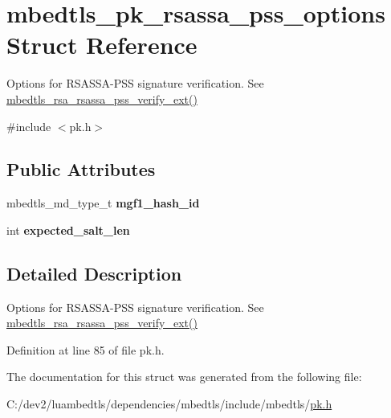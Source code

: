 \hypertarget{structmbedtls__pk__rsassa__pss__options}{\section{mbedtls\-\_\-pk\-\_\-rsassa\-\_\-pss\-\_\-options Struct Reference}
\label{structmbedtls__pk__rsassa__pss__options}
}


Options for R\-S\-A\-S\-S\-A-\/\-P\-S\-S signature verification. See {\ttfamily \hyperlink{rsa_8h_ac7791a1e03b00651a844dc6f5f32aaaa}{mbedtls\-\_\-rsa\-\_\-rsassa\-\_\-pss\-\_\-verify\-\_\-ext()}}  




{\ttfamily \#include $<$pk.\-h$>$}

\subsection*{Public Attributes}
\begin{DoxyCompactItemize}
\item 
\hypertarget{structmbedtls__pk__rsassa__pss__options_ab5ca5b88636ad6db1af4a67ddf748606}{mbedtls\-\_\-md\-\_\-type\-\_\-t {\bfseries mgf1\-\_\-hash\-\_\-id}}\label{structmbedtls__pk__rsassa__pss__options_ab5ca5b88636ad6db1af4a67ddf748606}

\item 
\hypertarget{structmbedtls__pk__rsassa__pss__options_a7d820886502754155458ba3d846f577d}{int {\bfseries expected\-\_\-salt\-\_\-len}}\label{structmbedtls__pk__rsassa__pss__options_a7d820886502754155458ba3d846f577d}

\end{DoxyCompactItemize}


\subsection{Detailed Description}
Options for R\-S\-A\-S\-S\-A-\/\-P\-S\-S signature verification. See {\ttfamily \hyperlink{rsa_8h_ac7791a1e03b00651a844dc6f5f32aaaa}{mbedtls\-\_\-rsa\-\_\-rsassa\-\_\-pss\-\_\-verify\-\_\-ext()}} 

Definition at line 85 of file pk.\-h.



The documentation for this struct was generated from the following file\-:\begin{DoxyCompactItemize}
\item 
C\-:/dev2/luambedtls/dependencies/mbedtls/include/mbedtls/\hyperlink{pk_8h}{pk.\-h}\end{DoxyCompactItemize}
